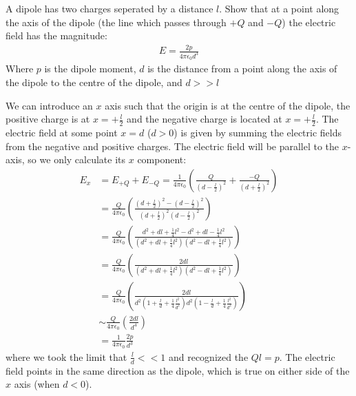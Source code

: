 \question A dipole has two charges seperated by a distance $l$. Show that at a point along the axis of the dipole (the line which passes through $+Q$ and $-Q$) the electric field has the magnitude:
\begin{align*}
E=\frac{2p}{4\pi\epsilon_0d^3}
\end{align*}
Where $p$ is the dipole moment, $d$ is the distance from a point along the axis of the dipole to the centre of the dipole, and $d >> l$
\begin{solution}
We can introduce an $x$ axis such that the origin is at the centre of the dipole, the positive charge is at $x=+\frac{l}{2}$ and the negative charge is located at $x=+\frac{l}{2}$. The electric field at some point $x=d$ ($d>0$) is given by summing the electric fields from the negative and positive charges. The electric field will be parallel to the $x$-axis, so we only calculate its $x$ component:
\begin{align*}
E_x&=E_{+Q}+E_{-Q}=\frac{1}{4\pi\epsilon_0}\left( \frac{Q}{\left(d-\frac{l}{2} \right)^2}+\frac{-Q}{\left(d+\frac{l}{2} \right)^2}\right)\\
&=\frac{Q}{4\pi\epsilon_0}\left( \frac{\left(d+\frac{l}{2} \right)^2-\left(d-\frac{l}{2} \right)^2}{\left(d+\frac{l}{2} \right)^2\left(d-\frac{l}{2} \right)^2}\right)\\
&=\frac{Q}{4\pi\epsilon_0}\left( \frac{d^2+dl+\frac{1}{4}l^2-d^2+dl-\frac{1}{4}l^2}{\left(d^2+dl+\frac{1}{4}l^2\right)\left(d^2-dl+\frac{1}{4}l^2\right)}\right)\\
&=\frac{Q}{4\pi\epsilon_0}\left( \frac{2dl}{\left(d^2+dl+\frac{1}{4}l^2\right)\left(d^2-dl+\frac{1}{4}l^2\right)}\right)\\
&=\frac{Q}{4\pi\epsilon_0}\left( \frac{2dl}{d^2\left(1+\frac{l}{d}+\frac{1}{4}\frac{l^2}{d^2}\right)d^2\left(1-\frac{l}{d}+\frac{1}{4}\frac{l^2}{d^2}\right)}\right)\\
&\sim \frac{Q}{4\pi\epsilon_0}\left( \frac{2dl}{d^4}\right)\\
&=\frac{1}{4\pi\epsilon_0}\frac{2p}{d^3}
\end{align*}
where we took the limit that $\frac{l}{d}<<1$ and recognized the $Ql=p$. The electric field points in the same direction as the dipole, which is true on either side of the $x$ axis (when $d<0$).
\end{solution}

